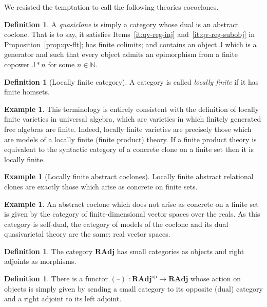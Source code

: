 \documentclass[11pt, a4paper, twoside,leqno]{amsart}
\newcommand{\cat}[1]{\mathbf{#1}}
\newcommand{\thg}{{\mathord{\text{--}}}}
\numberwithin{equation}{section}
\theoremstyle{plain}
\theoremstyle{definition}
\newtheorem{Defn}[Thm]{Definition}
\newtheorem{Ex}[Thm]{Example}
\begin{document}
We resisted the temptation to call the following theories cococlones.
\begin{Defn}
  \label{def:5}
  A \emph{quasiclone} is simply a category whose dual is an abstract
  coclone. That is to say, it 
  satisfies Items~\ref{it:qv-reg-inj}
  and~\ref{it:qv-reg-subobj} in Proposition~\ref{prop:qv-flt}; has
  finite colimits; and contains an object \(\mathsf{J}\) which is a
  generator and such that
  every object admits an epimorphism from a finite copower
  \(\mathsf{J}\ast n\) for some \(n\in \mathbb{N}
  \).
\end{Defn}

\begin{Defn}[Locally finite category]
  \label{def:lfc}
  A category is called \emph{locally
    finite} if it has finite homsets.
\end{Defn}
  \begin{Ex}
    \label{ex:concr-clo-loc-fin-theory}
    This terminology is entirely consistent with the definition of locally
  finite varieties in universal algebra, which are varieties in which
  finitely generated free algebras are finite. Indeed, locally finite
  varieties are precisely those which are models of a locally finite
  (finite product) theory. If a finite product theory is equivalent to the syntactic category
  of a concrete clone on a finite set then it is locally finite.  
  \end{Ex}
\begin{Ex}[Locally finite abstract coclones]
  \label{ex:loc-fin-arc}
  Locally finite abstract relational clones are exactly those which
  arise as concrete on finite sets. 
\end{Ex}

\begin{Ex}%
  \label{ex:vector-space}
  An abstract coclone which does not arise as 
  concrete on a finite set is given by the category
  of finite-dimensional vector spaces over the reals. As this category
  is self-dual, the category of models of the coclone and its
  dual quasivarietal theory are the same: real vector spaces. 
\end{Ex}


\begin{Defn}
  \label{def:rad-cat}
  The category \(\cat{RAdj}\) has small categories as objects and right
  adjoints as morphisms.
\end{Defn}

\begin{Defn}
  \label{def:func-o}
  There is a functor \((\thg)^{\circ} \colon \cat{RAdj} ^{\mathrm{op}} \rightarrow \cat{RAdj}\) whose
  action on objects is simply given by sending a small category to its
  opposite (dual) category and a right adjoint to its left adjoint.
\end{Defn}
\end{document}
